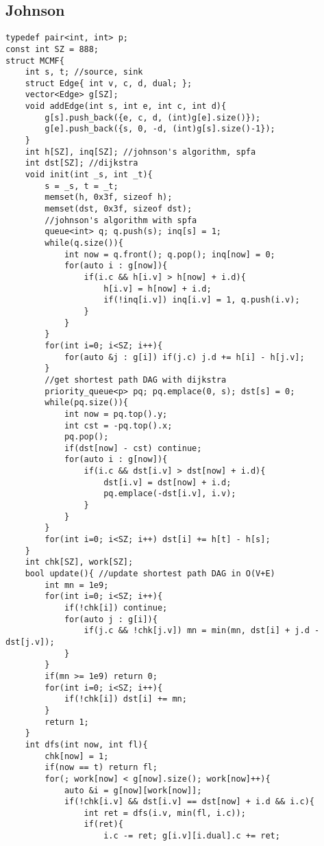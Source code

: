 \documentclass[landscape, 8pt, a4paper, oneside, twocolumn]{extarticle}
\begin{document}
\subsection{Johnson}
\begin{verbatim}
typedef pair<int, int> p;
const int SZ = 888;
struct MCMF{
    int s, t; //source, sink
    struct Edge{ int v, c, d, dual; };
    vector<Edge> g[SZ];
    void addEdge(int s, int e, int c, int d){
        g[s].push_back({e, c, d, (int)g[e].size()});
        g[e].push_back({s, 0, -d, (int)g[s].size()-1});
    }
    int h[SZ], inq[SZ]; //johnson's algorithm, spfa
    int dst[SZ]; //dijkstra
    void init(int _s, int _t){
        s = _s, t = _t;
        memset(h, 0x3f, sizeof h);
        memset(dst, 0x3f, sizeof dst);
        //johnson's algorithm with spfa
        queue<int> q; q.push(s); inq[s] = 1;
        while(q.size()){
            int now = q.front(); q.pop(); inq[now] = 0;
            for(auto i : g[now]){
                if(i.c && h[i.v] > h[now] + i.d){
                    h[i.v] = h[now] + i.d;
                    if(!inq[i.v]) inq[i.v] = 1, q.push(i.v);
                }
            }
        }
        for(int i=0; i<SZ; i++){
            for(auto &j : g[i]) if(j.c) j.d += h[i] - h[j.v];
        }
        //get shortest path DAG with dijkstra
        priority_queue<p> pq; pq.emplace(0, s); dst[s] = 0;
        while(pq.size()){
            int now = pq.top().y;
            int cst = -pq.top().x;
            pq.pop();
            if(dst[now] - cst) continue;
            for(auto i : g[now]){
                if(i.c && dst[i.v] > dst[now] + i.d){
                    dst[i.v] = dst[now] + i.d;
                    pq.emplace(-dst[i.v], i.v);
                }
            }
        }
        for(int i=0; i<SZ; i++) dst[i] += h[t] - h[s];
    }
    int chk[SZ], work[SZ];
    bool update(){ //update shortest path DAG in O(V+E)
        int mn = 1e9;
        for(int i=0; i<SZ; i++){
            if(!chk[i]) continue;
            for(auto j : g[i]){
                if(j.c && !chk[j.v]) mn = min(mn, dst[i] + j.d - dst[j.v]);
            }
        }
        if(mn >= 1e9) return 0;
        for(int i=0; i<SZ; i++){
            if(!chk[i]) dst[i] += mn;
        }
        return 1;
    }
    int dfs(int now, int fl){
        chk[now] = 1;
        if(now == t) return fl;
        for(; work[now] < g[now].size(); work[now]++){
            auto &i = g[now][work[now]];
            if(!chk[i.v] && dst[i.v] == dst[now] + i.d && i.c){
                int ret = dfs(i.v, min(fl, i.c));
                if(ret){
                    i.c -= ret; g[i.v][i.dual].c += ret;

\end{verbatim}
\end{document}
